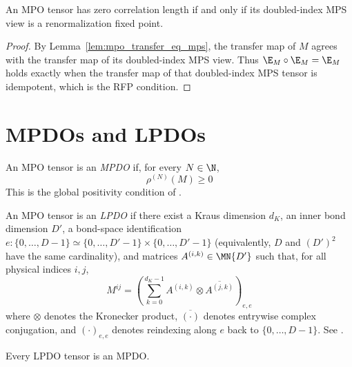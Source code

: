 \begin{theorem}%
    \label{thm:mpo_is_zcl_iff_to_mps_rfp}
    \leanok
    An MPO tensor has zero correlation length if and only if its doubled-index
    MPS view is a renormalization fixed point.
\end{theorem}

\begin{proof}
    \leanok
    By Lemma~\ref{lem:mpo_transfer_eq_mps}, the transfer map of $M$ agrees with
    the transfer map of its doubled-index MPS view. Thus
    $\E_M \circ \E_M = \E_M$ holds exactly when the transfer map of
    that doubled-index MPS tensor is idempotent, which is the RFP condition.
\end{proof}

\section{MPDOs and LPDOs}

\begin{definition}[MPDO]\label{def:mpdo}
    \leanok
    An MPO tensor is an \emph{MPDO} if, for every $N \in \N$,
    \[
        \rho^{(N)}(M) \ge 0
    \]
    This is the global positivity condition of \cite[Section~4]{Cirac2016MPDO_arXiv}.
\end{definition}

\begin{definition}[LPDO]\label{def:lpdo}
    \leanok
    An MPO tensor is an \emph{LPDO} if there exist a Kraus dimension $d_K$,
    an inner bond dimension $D'$, a bond-space identification
    $e : \{0, \ldots, D - 1\} \simeq \{0, \ldots, D' - 1\} \times \{0, \ldots, D' - 1\}$
    (equivalently, $D$ and $(D')^2$
    have the same cardinality), and matrices $A^{(i,k)} \in \MN{D'}$ such that,
    for all physical indices $i,j$,
    \[
        M^{ij}
        = \left(\sum_{k=0}^{d_K-1} A^{(i,k)} \otimes \overline{A^{(j,k)}}\right)_{e,e}
    \]
    where $\otimes$ denotes the Kronecker product, $\overline{(\cdot)}$
    denotes entrywise complex conjugation, and $(\cdot)_{e,e}$ denotes
    reindexing along $e$ back to $\{0, \ldots, D - 1\}$.
    See \cite[Section~4.3]{Cirac2016MPDO_arXiv}.
\end{definition}

\begin{theorem}\label{thm:lpdo_is_mpdo}
    \leanok
    Every LPDO tensor is an MPDO.
\end{theorem}

